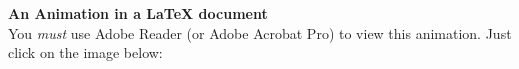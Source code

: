\documentclass{article}
\begin{document}
{\bf\Large An Animation in a \LaTeX{} document}\\
You {\em must} use Adobe Reader (or Adobe Acrobat Pro) to view this animation.  Just click on the image below:
\vfill

\end{document}
